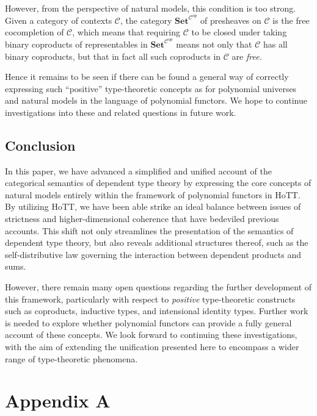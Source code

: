 \documentclass[
  11pt,
  oneside,
  article]{memoir}
\theoremstyle{definition}
\theoremstyle{plain}
\newcommand{\0}{\textsf{0}}
\newcommand{\1}{\tn{\textsf{1}}}
\begin{document}
However, from the perspective of natural models, this condition is too
strong. Given a category of contexts \(\mathcal{C}\), the category
\(\mathbf{Set}^{\mathcal{C}^{op}}\) of presheaves on \(\mathcal{C}\) is
the free cocompletion of \(\mathcal{C}\), which means that requiring
\(\mathcal{C}\) to be closed under taking binary coproducts of
representables in \(\mathbf{Set}^{\mathcal{C}^{op}}\) means not only
that \(\mathcal{C}\) has all binary coproducts, but that in fact all
such coproducts in \(\mathcal{C}\) are \emph{free.}

Hence it remains to be seen if there can be found a general way of
correctly expressing such ``positive'' type-theoretic concepts as for
polynomial universes and natural models in the language of polynomial
functors. We hope to continue investigations into these and related
questions in future work.

\section{Conclusion}\label{conclusion}

In this paper, we have advanced a simplified and unified account of the
categorical semantics of dependent type theory by expressing the core
concepts of natural models entirely within the framework of polynomial
functors in HoTT. By utilizing HoTT, we have been able strike an ideal
balance between issues of strictness and higher-dimensional coherence
that have bedeviled previous accounts. This shift not only streamlines
the presentation of the semantics of dependent type theory, but also
reveals additional structures thereof, such as the self-distributive law
governing the interaction between dependent products and sums.

However, there remain many open questions regarding the further
development of this framework, particularly with respect to
\emph{positive} type-theoretic constructs such as coproducts, inductive
types, and intensional identity types. Further work is needed to explore
whether polynomial functors can provide a fully general account of these
concepts. We look forward to continuing these investigations, with the
aim of extending the unification presented here to encompass a wider
range of type-theoretic phenomena.

\printbibliography

\chapter{Appendix A}\label{appendix-a}
\end{document}
